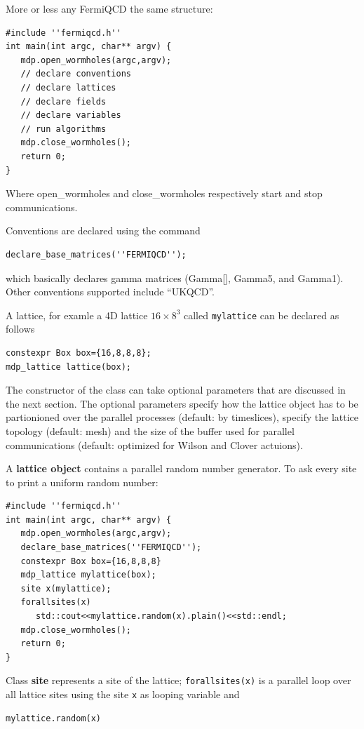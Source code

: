 More or less any FermiQCD the same structure:
\begin{verbatim}
#include ''fermiqcd.h''
int main(int argc, char** argv) {
   mdp.open_wormholes(argc,argv);
   // declare conventions
   // declare lattices
   // declare fields
   // declare variables
   // run algorithms
   mdp.close_wormholes();
   return 0;
}
\end{verbatim}

Where open\_wormholes and close\_wormholes respectively start and stop
communications.

Conventions are declared using the command
\begin{verbatim}
declare_base_matrices(''FERMIQCD'');
\end{verbatim}

which basically declares gamma matrices (Gamma[], Gamma5, and Gamma1). Other
conventions supported include ``UKQCD''.

A lattice, for examle a 4D lattice $16\times 8^3$ called {\tt mylattice} can
be declared as follows
\begin{verbatim}
constexpr Box box={16,8,8,8};
mdp_lattice lattice(box);
\end{verbatim}

The constructor of the class can take optional parameters that are discussed
in the next section. The optional parameters specify how the lattice object
has to be partionioned over the parallel processes (default: by timeslices),
specify the lattice topology (default: mesh) and the size of the buffer used
for parallel communications (default: optimized for Wilson and Clover
actuions).

A {\bf lattice object} contains a parallel random number generator. To ask
every site to print a uniform random number:
\begin{verbatim}
#include ''fermiqcd.h''
int main(int argc, char** argv) {
   mdp.open_wormholes(argc,argv);
   declare_base_matrices(''FERMIQCD'');
   constexpr Box box={16,8,8,8}
   mdp_lattice mylattice(box);
   site x(mylattice);
   forallsites(x)
      std::cout<<mylattice.random(x).plain()<<std::endl;
   mdp.close_wormholes();
   return 0;
}
\end{verbatim}

Class {\bf site} represents a site of the lattice; {\tt forallsites(x)} is a
parallel loop over all lattice sites using the site {\tt x} as looping
variable and
\begin{verbatim}
mylattice.random(x)
\end{verbatim}

